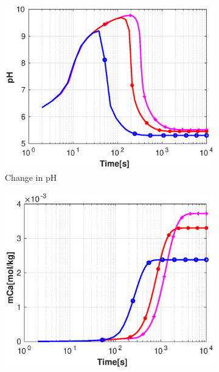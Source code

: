 \begin{figure}[!h]
        \centering
    \begin{subfigure}{.5\linewidth}
        \centering
        \includegraphics[width=\textwidth]{PICTURES/with_vel_pH.eps}
        \caption{\small Change in pH}
        \label{fig:velpH}       %
    \end{subfigure}%
        \hfill
    \begin{subfigure}{.5\linewidth}
        \centering
        \includegraphics[width=\textwidth]{PICTURES/with_vel_mCa.eps}

\end{subfigure}
\end{figure}

